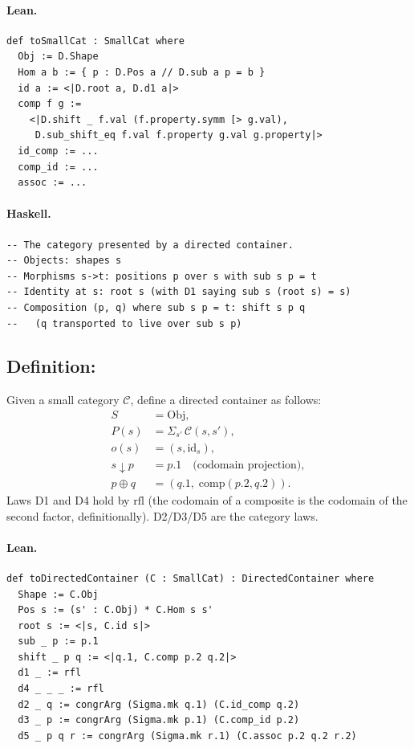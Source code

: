 \documentclass[11pt,a4paper]{article}
\begin{document}
\paragraph{Lean.}
\begin{lstlisting}[style=lean]
def toSmallCat : SmallCat where
  Obj := D.Shape
  Hom a b := { p : D.Pos a // D.sub a p = b }
  id a := <|D.root a, D.d1 a|>
  comp f g :=
    <|D.shift _ f.val (f.property.symm [> g.val),
     D.sub_shift_eq f.val f.property g.val g.property|>
  id_comp := ...
  comp_id := ...
  assoc := ...
\end{lstlisting}

\paragraph{Haskell.}
\begin{lstlisting}[style=haskell]
-- The category presented by a directed container.
-- Objects: shapes s
-- Morphisms s->t: positions p over s with sub s p = t
-- Identity at s: root s (with D1 saying sub s (root s) = s)
-- Composition (p, q) where sub s p = t: shift s p q
--   (q transported to live over sub s p)
\end{lstlisting}


\subsection{Definition: }

\begin{defn}
Given a small category $\mathcal{C}$, define a directed container as follows:
\begin{align*}
  S &= \mathrm{Obj}, \\
  P(s) &= \Sigma_{s'}\, \mathcal{C}(s, s'), \\
  o(s) &= (s, \mathrm{id}_s), \\
  s \downarrow p &= p.1 \quad\text{(codomain projection)}, \\
  p \oplus q &= (q.1,\; \mathrm{comp}(p.2, q.2)).
\end{align*}
Laws D1 and D4 hold by $\mathrm{rfl}$ (the codomain of a composite is the
codomain of the second factor, definitionally).  D2/D3/D5 are the category
laws.
\end{defn}

\paragraph{Lean.}
\begin{lstlisting}[style=lean]
def toDirectedContainer (C : SmallCat) : DirectedContainer where
  Shape := C.Obj
  Pos s := (s' : C.Obj) * C.Hom s s'
  root s := <|s, C.id s|>
  sub _ p := p.1
  shift _ p q := <|q.1, C.comp p.2 q.2|>
  d1 _ := rfl
  d4 _ _ _ := rfl
  d2 _ q := congrArg (Sigma.mk q.1) (C.id_comp q.2)
  d3 _ p := congrArg (Sigma.mk p.1) (C.comp_id p.2)
  d5 _ p q r := congrArg (Sigma.mk r.1) (C.assoc p.2 q.2 r.2)
\end{lstlisting}
\end{document}
